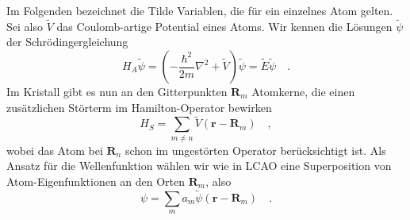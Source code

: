 Im Folgenden bezeichnet die Tilde Variablen, die für ein einzelnes Atom gelten. Sei also $\tilde{V}$ das Coulomb-artige Potential eines Atoms. Wir kennen die Lösungen $\tilde{\psi}$ der Schrödingergleichung
\begin{equation}
    H_A \tilde{\psi}  = \left( - \frac{\hbar^2}{2m} \nabla^2 + \tilde{V} \right) \tilde{\psi} = \tilde{E} \tilde{\psi} \quad .
\end{equation}
Im Kristall gibt es nun an den Gitterpunkten $\mathbf{R}_m$ Atomkerne, die einen zusätzlichen Störterm im Hamilton-Operator bewirken
\begin{equation}
    H_S = \sum_{m \neq n} \tilde{V}(\mathbf{r} - \mathbf{R}_m) \quad ,
\end{equation}
wobei das Atom bei $\mathbf{R}_n$ schon im ungestörten Operator berücksichtigt ist. Als Ansatz für die Wellenfunktion wählen wir wie in LCAO eine Superposition von Atom-Eigenfunktionen an den Orten $\mathbf{R}_m$, also
\begin{equation}
    \psi = \sum_m a_m \tilde{\psi} (\mathbf{r} - \mathbf{R}_m) \quad .
\end{equation}

